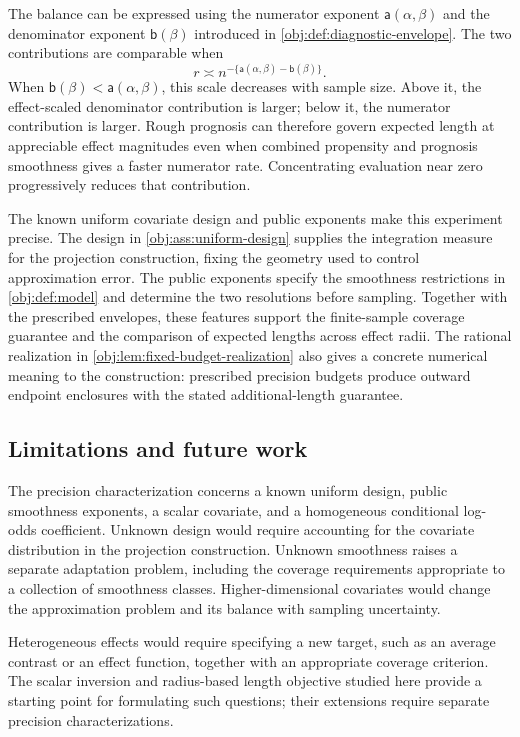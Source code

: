 The balance can be expressed using the numerator exponent \(\mathsf a(\alpha,\beta)\) and the denominator exponent \(\mathsf b(\beta)\) introduced in \cref{obj:def:diagnostic-envelope}. The two contributions are comparable when
\[
r\asymp n^{-\{\mathsf a(\alpha,\beta)-\mathsf b(\beta)\}}.
\]
When \(\mathsf b(\beta)<\mathsf a(\alpha,\beta)\), this scale decreases with sample size. Above it, the effect-scaled denominator contribution is larger; below it, the numerator contribution is larger. Rough prognosis can therefore govern expected length at appreciable effect magnitudes even when combined propensity and prognosis smoothness gives a faster numerator rate. Concentrating evaluation near zero progressively reduces that contribution.

The known uniform covariate design and public exponents make this experiment precise. The design in \cref{obj:ass:uniform-design} supplies the integration measure for the projection construction, fixing the geometry used to control approximation error. The public exponents specify the smoothness restrictions in \cref{obj:def:model} and determine the two resolutions before sampling. Together with the prescribed envelopes, these features support the finite-sample coverage guarantee and the comparison of expected lengths across effect radii. The rational realization in \cref{obj:lem:fixed-budget-realization} also gives a concrete numerical meaning to the construction: prescribed precision budgets produce outward endpoint enclosures with the stated additional-length guarantee.

\subsection{Limitations and future work}

The precision characterization concerns a known uniform design, public smoothness exponents, a scalar covariate, and a homogeneous conditional log-odds coefficient. Unknown design would require accounting for the covariate distribution in the projection construction. Unknown smoothness raises a separate adaptation problem, including the coverage requirements appropriate to a collection of smoothness classes. Higher-dimensional covariates would change the approximation problem and its balance with sampling uncertainty.

Heterogeneous effects would require specifying a new target, such as an average contrast or an effect function, together with an appropriate coverage criterion. The scalar inversion and radius-based length objective studied here provide a starting point for formulating such questions; their extensions require separate precision characterizations.

